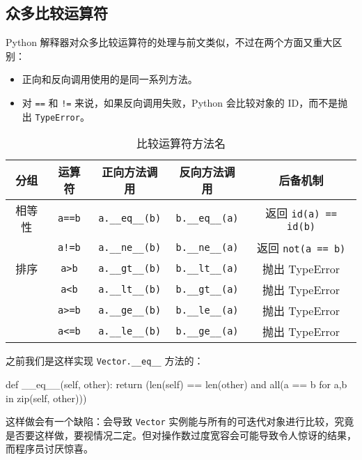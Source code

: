 \subsection{众多比较运算符}

Python 解释器对众多比较运算符的处理与前文类似，不过在两个方面又重大区别：

\begin{itemize}
    \item 正向和反向调用使用的是同一系列方法。
    \item 对 \texttt{==} 和 \texttt{!=} 来说，如果反向调用失败，Python 会比较对象的 ID，而不是抛出 \texttt{TypeError}。
\end{itemize}

\begin{table}[H]
    \centering
    \caption{比较运算符方法名}
    \label{table:比较运算符方法名}
    \setlength{\tabcolsep}{4mm}
    \begin{tabular}{c|c|ccc}
        \toprule
        \textbf{分组} & \textbf{运算符} & \textbf{正向方法调用} & \textbf{反向方法调用} & \textbf{后备机制} \\
        \midrule
        相等性 & \texttt{a==b} & \texttt{a.\_\_eq\_\_(b)} & \texttt{b.\_\_eq\_\_(a)} & 返回 \texttt{id(a) == id(b)} \\
         & \texttt{a!=b} & \texttt{a.\_\_ne\_\_(b)} & \texttt{b.\_\_ne\_\_(a)} & 返回 \texttt{not(a == b)}\\
        \midrule
        排序 & \texttt{a>b} & \texttt{a.\_\_gt\_\_(b)} & \texttt{b.\_\_lt\_\_(a)} & 抛出 TypeError\\
         & \texttt{a<b} & \texttt{a.\_\_lt\_\_(b)} & \texttt{b.\_\_gt\_\_(a)} & 抛出 TypeError\\
         & \texttt{a>=b} & \texttt{a.\_\_ge\_\_(b)} & \texttt{b.\_\_le\_\_(a)} & 抛出 TypeError\\
         & \texttt{a<=b} & \texttt{a.\_\_le\_\_(b)} & \texttt{b.\_\_ge\_\_(a)} & 抛出 TypeError\\
        \bottomrule
    \end{tabular}
\end{table}

之前我们是这样实现 \texttt{Vector.\_\_eq\_\_} 方法的：
\begin{python}
def __eq__(self, other):
    return (len(self) == len(other) and all(a == b for a,b in zip(self, other)))
\end{python}

这样做会有一个缺陷：会导致 \texttt{Vector} 实例能与所有的可迭代对象进行比较，究竟是否要这样做，要视情况二定。但对操作数过度宽容会可能导致令人惊讶的结果，而程序员讨厌惊喜。

